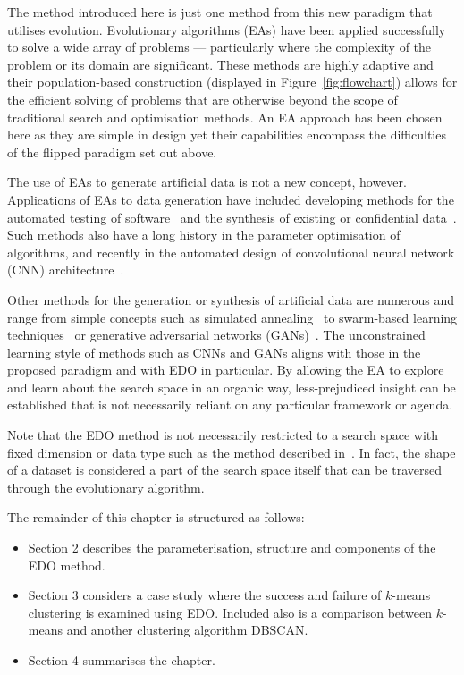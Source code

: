 
The method introduced here is just one method from this new paradigm that
utilises evolution. Evolutionary algorithms (EAs) have been applied successfully
to solve a wide array of problems --- particularly where the complexity of the
problem or its domain are significant. These methods are highly adaptive and
their population-based construction (displayed in Figure~\ref{fig:flowchart})
allows for the efficient solving of problems that are otherwise beyond the scope
of traditional search and optimisation methods. An EA approach has been chosen
here as they are simple in design yet their capabilities encompass the
difficulties of the flipped paradigm set out above.


The use of EAs to generate artificial data is not a new concept, however.
Applications of EAs to data generation have included developing methods for the
automated testing of software~\cite{Koleejan2015,Michael2001,Sharifipour2018}
and the synthesis of existing or confidential data~\cite{Chen2016}. Such methods
also have a long history in the parameter optimisation of algorithms, and
recently in the automated design of convolutional neural network (CNN)
architecture~\cite{Suganuma2017,Sun2018}.

Other methods for the generation or synthesis of artificial data are numerous
and range from simple concepts such as simulated annealing~\cite{Matejka2017}
to swarm-based learning techniques~\cite{Abualigah2018b} or generative
adversarial networks (GANs)~\cite{Goodfellow2014}. The unconstrained learning
style of methods such as CNNs and GANs aligns with those in the proposed
paradigm and with EDO in particular. By allowing the EA to explore and learn
about the search space in an organic way, less-prejudiced insight can be
established that is not necessarily reliant on any particular framework or
agenda.

Note that the EDO method is not necessarily restricted to a search space with
fixed dimension or data type such as the method described in~\cite{Chen2016}. In
fact, the shape of a dataset is considered a part of the search space itself
that can be traversed through the evolutionary algorithm.

The remainder of this chapter is structured as follows:
\begin{itemize}
    \item Section 2 describes the parameterisation, structure and components of
        the EDO method.
    \item Section 3 considers a case study where the success and failure of
        \(k\)-means clustering is examined using EDO. Included also is a
        comparison between \(k\)-means and another clustering algorithm DBSCAN.\
    \item Section 4 summarises the chapter.
\end{itemize}


